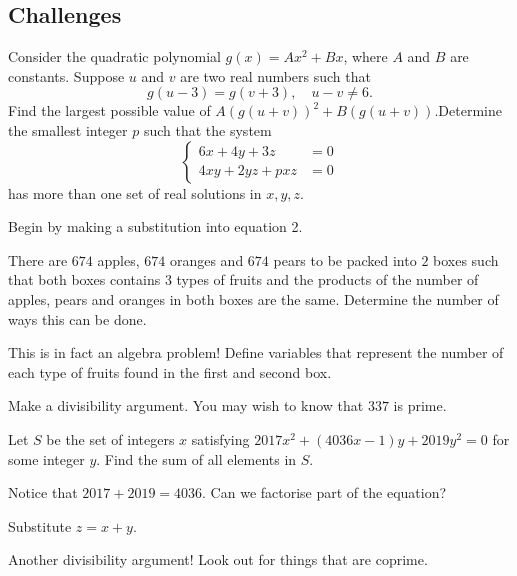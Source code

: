 \documentclass[../jarvis.tex]{subfiles}
\begin{document}
\subsection{Challenges}
\problem[2014 SMO(O) P3]Consider the quadratic polynomial $g(x)=Ax^2+Bx$, where $A$ and $B$ are constants. Suppose $u$ and $v$ are two real numbers such that $$g(u-3)=g(v+3), \quad u-v\neq 6.$$
Find the largest possible value of $A(g(u+v))^2+B(g(u+v))$.\problem[2020 SMO(O) P16]Determine the smallest integer $p$ such that the system
$$\begin{cases}
    6x+4y+3z&=0 \\
    4xy+2yz+pxz&=0
\end{cases}$$
has more than one set of real solutions in $x,y,z$.
\begin{hints}
    \begin{hint}
        Begin by making a substitution into equation 2.
    \end{hint}
\end{hints}
\problem[2017 SMO(O) P16]There are $674$ apples, $674$ oranges and $674$ pears to be packed into $2$ boxes such that both boxes contains $3$ types of fruits and the products of the number of apples, pears and oranges in both boxes are the same. Determine the number of ways this can be done.
\begin{hints}
    \begin{hint}
        This is in fact an algebra problem! Define variables that represent the number of each type of fruits found in the first and second box.
    \end{hint}
    \begin{hint}
        Make a divisibility argument. You may wish to know that $337$ is prime.
    \end{hint}
\end{hints}

\problem[2017 SMO(O) P17]Let $S$ be the set of integers $x$ satisfying $2017x^2+(4036x-1)y+2019y^2=0$ for some integer $y$. Find the sum of all elements in $S$.
\begin{hints}
    \begin{hint}
        Notice that $2017+2019=4036$. Can we factorise part of the equation?
    \end{hint}
    \begin{hint}
        Substitute $z=x+y$.
    \end{hint}
    \begin{hint}
        Another divisibility argument! Look out for things that are coprime.
    \end{hint}
\end{hints}
\end{document}
